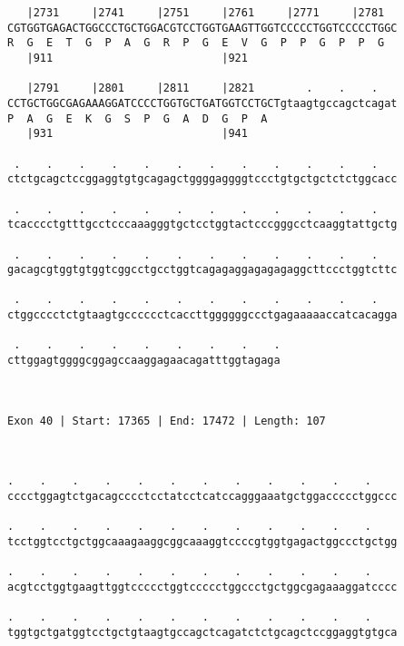 \documentclass{article}
\begin{document}
\begin{Verbatim}
   |2731     |2741     |2751     |2761     |2771     |2781  
CGTGGTGAGACTGGCCCTGCTGGACGTCCTGGTGAAGTTGGTCCCCCTGGTCCCCCTGGC
R  G  E  T  G  P  A  G  R  P  G  E  V  G  P  P  G  P  P  G  
   |911                          |921                       
  
   |2791     |2801     |2811     |2821        .    .    .   
CCTGCTGGCGAGAAAGGATCCCCTGGTGCTGATGGTCCTGCTgtaagtgccagctcagat
P  A  G  E  K  G  S  P  G  A  D  G  P  A                    
   |931                          |941                       
  
 .    .    .    .    .    .    .    .    .    .    .    .   
ctctgcagctccggaggtgtgcagagctggggaggggtccctgtgctgctctctggcacc
                                                            
 .    .    .    .    .    .    .    .    .    .    .    .   
tcacccctgtttgcctcccaaagggtgctcctggtactcccgggcctcaaggtattgctg
                                                            
 .    .    .    .    .    .    .    .    .    .    .    .   
gacagcgtggtgtggtcggcctgcctggtcagagaggagagagaggcttccctggtcttc
                                                            
 .    .    .    .    .    .    .    .    .    .    .    .   
ctggcccctctgtaagtgcccccctcaccttggggggccctgagaaaaaccatcacagga
                                                            
 .    .    .    .    .    .    .    .    .
cttggagtggggcggagccaaggagaacagatttggtagaga
                                          
                                          
 
Exon 40 | Start: 17365 | End: 17472 | Length: 107



.    .    .    .    .    .    .    .    .    .    .    .    
cccctggagtctgacagcccctcctatcctcatccagggaaatgctggaccccctggccc
                                                            
.    .    .    .    .    .    .    .    .    .    .    .    
tcctggtcctgctggcaaagaaggcggcaaaggtccccgtggtgagactggccctgctgg
                                                            
.    .    .    .    .    .    .    .    .    .    .    .    
acgtcctggtgaagttggtccccctggtccccctggccctgctggcgagaaaggatcccc
                                                            
.    .    .    .    .    .    .    .    .    .    .    .    
tggtgctgatggtcctgctgtaagtgccagctcagatctctgcagctccggaggtgtgca
                                                            

\end{Verbatim}
\end{document}
